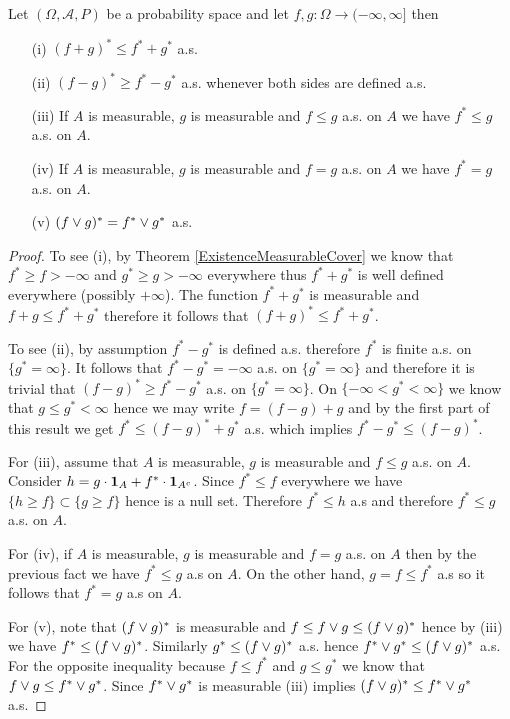 \begin{prop}\label{BasicPropertiesOfMeasurableCover} Let $(\Omega, \mathcal{A}, P)$  be a probability space and let $f,g : \Omega \to (-\infty, \infty]$ then
\begin{itemize}
\item[(i)] $(f+g)^* \leq f^* + g^*$ a.s.
\item[(ii)] $(f - g)^* \geq f^* - g^*$ a.s. whenever both sides are defined a.s. 
\item[(iii)] If $A$ is measurable, $g$ is measurable and $f \leq g$ a.s. on $A$ we have $f^* \leq g$ a.s. on $A$.  
\item[(iv)] If $A$ is measurable, $g$ is measurable and $f = g$ a.s. on $A$ we have $f^* = g$ a.s. on $A$.
\item[(v)] $(f \vee g)^* = f^* \vee g^*$ a.s.
\end{itemize}
\end{prop}
\begin{proof}
To see (i), by Theorem \ref{ExistenceMeasurableCover} we know that $f^* \geq f > -\infty$ and $g^* \geq g > -\infty$ everywhere thus $f^* + g^*$ is well defined everywhere (possibly $+\infty$).  The function
$f^* + g^*$ is measurable and $f+g \leq f^* + g^*$ therefore it follows that $(f+g)^* \leq f^* + g^*$.

To see (ii), by assumption $f^* - g^*$ is defined a.s. therefore $f^*$ is finite a.s. on $\lbrace g^* = \infty \rbrace$.  It follows that $f^* - g^* = -\infty$ a.s. on $\lbrace g^* = \infty \rbrace$ and therefore it is trivial that $(f-g)^* \geq f^* - g^*$ a.s. on $\lbrace g^* = \infty \rbrace$.  On $\lbrace -\infty < g^* < \infty \rbrace$ we know that $g \leq g^* < \infty$ hence we may write $f = (f - g) + g$ and by the first part of this result we get $f^* \leq (f -g)^*+ g^*$ a.s. which implies $f^* - g^* \leq (f - g)^*$.

For (iii), assume that $A$ is measurable, $g$ is measurable and $f \leq g$ a.s. on $A$.  Consider $h = g \cdot \textbf{1}_{A} + f^* \cdot \textbf{1}_{A^c}$.  Since $f^* \leq f$ everywhere we have
$\lbrace h \geq f \rbrace \subset \lbrace g  \geq f \rbrace$ hence is a null set.  Therefore $f^* \leq h$ a.s and therefore $f^* \leq g$ a.s. on $A$.

For (iv), if $A$ is measurable, $g$ is measurable and $f = g$ a.s. on $A$ then by the previous fact we have $f^* \leq g$ a.s on $A$.  On the other hand, $g = f \leq f^*$ a.s so it follows that $f^* = g$ a.s on $A$.

For (v), note that $(f \vee g)^*$ is measurable and $f \leq f \vee g \leq (f \vee g)^*$ hence by (iii) we have $f^* \leq (f \vee g)^*$.  Similarly $g^* \leq (f \vee g)^*$ a.s. hence $f^* \vee g^* \leq (f \vee g)^*$ a.s.  For the opposite inequality because $f \leq f^*$ and $g \leq g^*$ we know that $f \vee g \leq f^* \vee g^*$.  Since $f^* \vee g^*$ is measurable (iii) implies $(f \vee g)^* \leq f^* \vee g^*$ a.s.
\end{proof}


